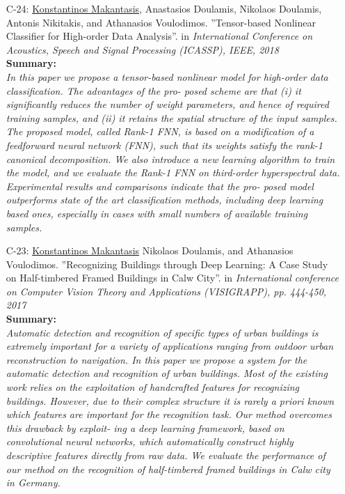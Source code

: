 \documentclass[a4paper,10pt]{article}
\begin{document}
\begin{itemize}
	\item [C-24:]\underline{Konstantinos Makantasis}, Anastasios Doulamis, Nikolaos Doulamis, Antonis Nikitakis, and Athanasios Voulodimos. ''Tensor-based Nonlinear Classifier for High-order Data Analysis''. in \textit{International Conference on Acoustics, Speech and Signal Processing (ICASSP), IEEE, 2018}\\
	\textbf{Summary:}\\
	\textit{In this paper we propose a tensor-based nonlinear model for high-order data classification. The advantages of the pro- posed scheme are that (i) it significantly reduces the number of weight parameters, and hence of required training samples, and (ii) it retains the spatial structure of the input samples. The proposed model, called Rank-1 FNN, is based on a modification of a feedforward neural network (FNN), such that its weights satisfy the rank-1 canonical decomposition. We also introduce a new learning algorithm to train the model, and we evaluate the Rank-1 FNN on third-order hyperspectral data. Experimental results and comparisons indicate that the pro- posed model outperforms state of the art classification methods, including deep learning based ones, especially in cases with small numbers of available training samples.}
	
	\item [C-23:]\underline{Konstantinos Makantasis} Nikolaos Doulamis, and Athanasios Voulodimos. ''Recognizing Buildings through Deep Learning: A Case Study on Half-timbered Framed Buildings in Calw City''. in \textit{International conference on Computer Vision Theory and Applications (VISIGRAPP), pp. 444-450, 2017}\\
	\textbf{Summary:}\\
	\textit{Automatic detection and recognition of specific types of urban buildings is extremely important for a variety of applications ranging from outdoor urban reconstruction to navigation. In this paper we propose a system for the automatic detection and recognition of urban buildings. Most of the existing work relies on the exploitation of handcrafted features for recognizing buildings. However, due to their complex structure it is rarely a priori known which features are important for the recognition task. Our method overcomes this drawback by exploit- ing a deep learning framework, based on convolutional neural networks, which automatically construct highly descriptive features directly from raw data. We evaluate the performance of our method on the recognition of half-timbered framed buildings in Calw city in Germany.}
	

\end{itemize}
\end{document}
